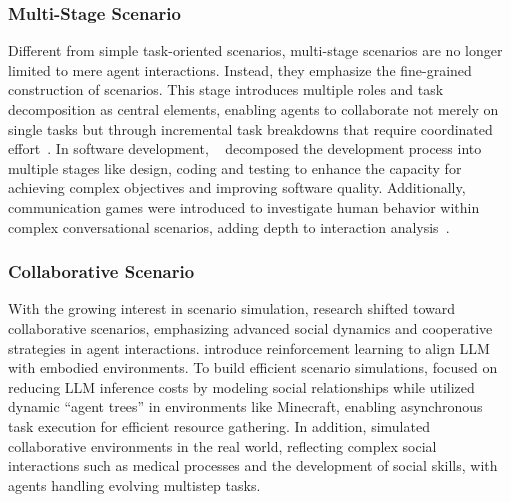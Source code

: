 \subsubsection{Multi-Stage Scenario}
Different from simple task-oriented scenarios, multi-stage scenarios are no longer limited to mere agent interactions. Instead, they emphasize the fine-grained construction of scenarios. 
This stage introduces multiple roles and task decomposition as central elements, enabling agents to collaborate not merely on single tasks but through incremental task breakdowns that require coordinated effort~\cite{zhang2023building,mandi2024roco}. 
In software development, ~\cite{qian2024chatdev,hong2023metagpt} decomposed the development process into multiple stages like design, coding and testing to enhance the capacity for achieving complex objectives and improving software quality.
Additionally, communication games were introduced to investigate human behavior within complex conversational scenarios, adding depth to interaction analysis~\cite{xu2023exploring,wang2023avalon,zhang2023exploring,light2023text}.

\subsubsection{Collaborative Scenario}
With the growing interest in scenario simulation, research shifted toward collaborative scenarios, emphasizing advanced social dynamics and cooperative strategies in agent interactions. \cite{tan2024true,zhang2024towards} introduce reinforcement learning to align LLM with embodied environments. 
To build efficient scenario simulations, \cite{yu2024affordable} focused on reducing LLM inference costs by modeling social relationships while \cite{chen2024s} utilized dynamic ``agent trees'' in environments like Minecraft, enabling asynchronous task execution for efficient resource gathering. 
In addition, \cite{fan2024ai,yan2024social} simulated collaborative environments in the real world, reflecting complex social interactions such as medical processes and the development of social skills, with agents handling evolving multistep tasks.




